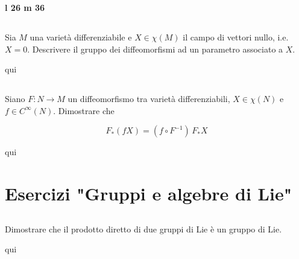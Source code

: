 \textbf{l 26 m 36}

\tocless\section{}\label{es2-33}

\begin{tcolorbox}
	Sia $ M $ una varietà differenziabile e $ X \in \chi(M) $ il campo di vettori nullo, i.e. $ X = 0 $. Descrivere il gruppo dei diffeomorfismi ad un parametro associato a $ X $.
\end{tcolorbox}

qui

\tocless\section{}\label{es2-34}

\begin{tcolorbox}
	Siano $ F : N \to M $ un diffeomorfismo tra varietà differenziabili, $ X \in \chi(N) $ e $ f \in C^{\infty}(N) $. Dimostrare che
	
	\begin{equation}
		F_{*}(f X) = (f \circ F^{-1}) \, F_{*} X
	\end{equation}
\end{tcolorbox}

qui

\chapter{Esercizi "Gruppi e algebre di Lie"}

\tocless\section{}\label{es3-1}

\begin{tcolorbox}
	Dimostrare che il prodotto diretto di due gruppi di Lie è un gruppo di Lie.
\end{tcolorbox}

qui

\tocless\section{}\label{es3-2}

